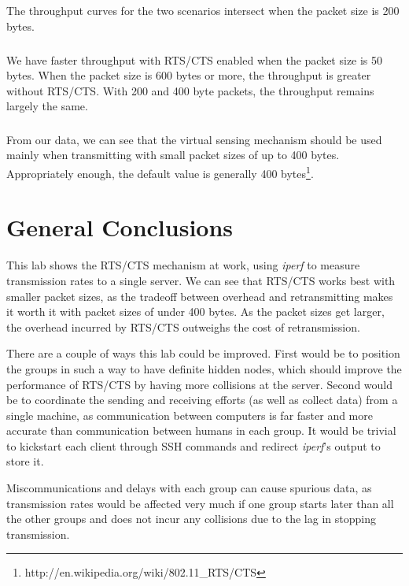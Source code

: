 \documentclass[11pt]{article}
\begin{document}
\subsection{}

\subsubsection{}

The throughput curves for the two scenarios intersect when the packet size is 200 bytes.

\subsubsection{}

We have faster throughput with RTS/CTS enabled when the packet size is 50 bytes. When the packet size is 600 bytes or more, the throughput is greater without RTS/CTS. With 200 and 400 byte packets, the throughput remains largely the same.

\subsubsection{}

From our data, we can see that the virtual sensing mechanism should be used mainly when transmitting with small packet sizes of up to 400 bytes. Appropriately enough, the default value is generally 400 bytes\footnote{http://en.wikipedia.org/wiki/802.11\_RTS/CTS}.

\section{General Conclusions}

This lab shows the RTS/CTS mechanism at work, using \emph{iperf} to measure transmission rates to a single server. We can see that RTS/CTS works best with smaller packet sizes, as the tradeoff between overhead and retransmitting makes it worth it with packet sizes of under 400 bytes. As the packet sizes get larger, the overhead incurred by RTS/CTS outweighs the cost of retransmission.

There are a couple of ways this lab could be improved. First would be to position the groups in such a way to have definite hidden nodes, which should improve the performance of RTS/CTS by having more collisions at the server. Second would be to coordinate the sending and receiving efforts (as well as collect data) from a single machine, as communication between computers is far faster and more accurate than communication between humans in each group. It would be trivial to kickstart each client through SSH commands and redirect \emph{iperf}'s output to store it.

Miscommunications and delays with each group can cause spurious data, as transmission rates would be affected very much if one group starts later than all the other groups and does not incur any collisions due to the lag in stopping transmission.
\end{document}
